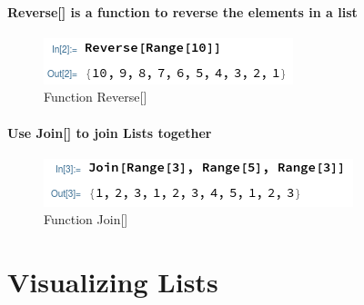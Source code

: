 \documentclass[UTF8]{book}
\begin{document}
			\paragraph{Reverse[] is a function to reverse the elements in a list}
			\begin{figure}[h!]
				\centering
				\includegraphics[width=0.7\linewidth]{pics/Reverse}
				\caption{Function Reverse[]}
				\label{fig:reverse}
			\end{figure}
			\paragraph{Use Join[] to join Lists together}
			\begin{figure}[h!]
				\centering
				\includegraphics[width=0.7\linewidth]{pics/Join}
				\caption{Function Join[]}
				\label{fig:join}
			\end{figure}
		\section{Visualizing Lists}
			
		
		
		
			
			
			
			
				
				
\end{document}
